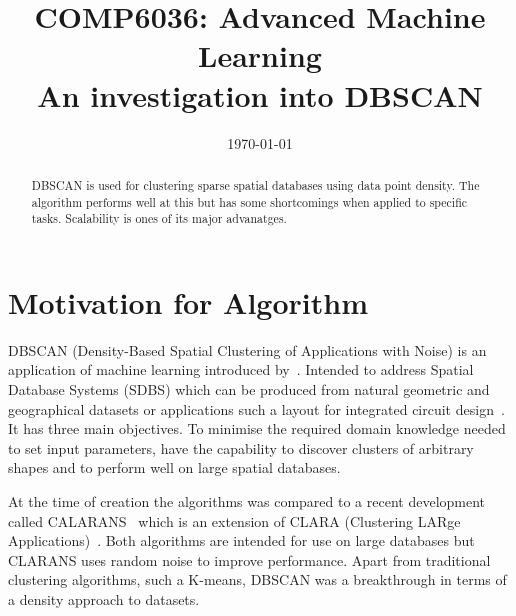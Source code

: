 \documentclass{ecsarticle}     %
\begin{document}
\frontmatter
\title      {COMP6036: Advanced Machine Learning\\
            An investigation into DBSCAN}
      
\addresses  {\deptname\\\univname}

\date       {\today}
\subject    {}
\keywords   {}
\maketitle



\begin{abstract}
DBSCAN is used for clustering sparse spatial databases using data point density.
The algorithm performs well at this but has some shortcomings when applied to specific tasks.
Scalability is ones of its major advanatges.
\end{abstract}

\mainmatter


\section{Motivation for Algorithm}

DBSCAN (Density-Based Spatial Clustering of Applications with Noise) is an application of machine learning introduced by~\cite{ester96dbscan}.
Intended to address Spatial Database Systems (SDBS) which can be produced from natural geometric and geographical datasets or applications such a layout for integrated circuit design~\citep{guting94sdbs}.
It has three main objectives.
To minimise the required domain knowledge needed to set input parameters, have the capability to discover clusters of arbitrary shapes and to perform well on large spatial databases.

At the time of creation the algorithms was compared to a recent development called CALARANS~\citep{ng94clarans} which is an extension of CLARA (Clustering LARge Applications)~\citep{kaufman90clara}.
Both algorithms are intended for use on large databases but CLARANS uses random noise to improve performance.
Apart from traditional clustering algorithms, such a K-means, DBSCAN was a breakthrough in terms of a density approach to datasets.
\end{document}
